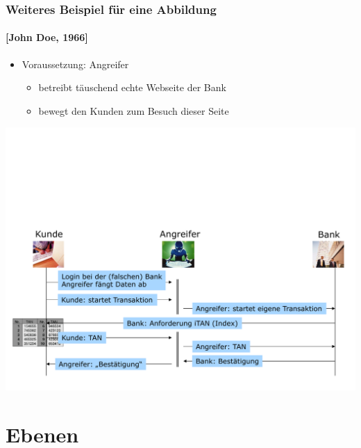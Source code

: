 \begin{frame}
	\frametitle{Weiteres Beispiel für eine Abbildung}
	\framesubtitle{[John Doe, 1966] }
	\begin{itemize}
		\item Voraussetzung: {\color{black} Angreifer} 
			\begin{itemize}
				\item betreibt täuschend echte Webseite der Bank
				\item bewegt den Kunden zum Besuch dieser Seite
			\end{itemize}
	\end{itemize}
	\vspace{\fill}
	\begin{center}
		\includegraphics[width=\textwidth]{pic/abbildung3.pdf}
	\end{center}
\end{frame}

\section{Ebenen} %

